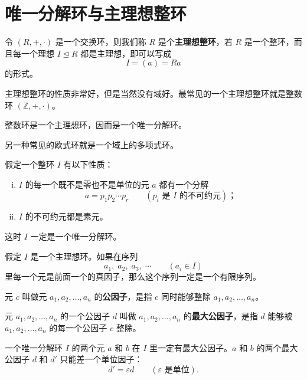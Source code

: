\section{唯一分解环与主理想整环}

\begin{definition}[定义 2.25：主理想整环]
令 $(R,+,\cdot)$ 是一个交换环，则我们称 $R$ 是个\textbf{主理想整环}，若 $R$ 是一个整环，而且每一个理想 $I\trianglelefteq R$ 都是主理想，即可以写成
\[
I=(a)=Ra
\]
的形式。

主理想整环的性质非常好，但是当然没有域好。最常见的一个主理想整环就是整数环 $(\mathbb{Z},+,\cdot)$。
\end{definition}

\begin{theorem}[定理 2：整数环是主理想环]
整数环是一个主理想环，因而是一个唯一分解环。

另一种常见的欧式环就是一个域上的多项式环。
\end{theorem}

\begin{theorem}[定理 2：整环成为唯一分解环的条件]
假定一个整环 $I$ 有以下性质：
\begin{enumerate}[(i)]
  \item $I$ 的每一个既不是零也不是单位的元 $a$ 都有一个分解
  \[
    a=p_1p_2\cdots p_r\qquad(p_i\text{ 是 }I\text{ 的不可约元})；
  \]
  \item[(iii)] $I$ 的不可约元都是素元。
\end{enumerate}
这时 $I$ 一定是一个唯一分解环。
\end{theorem}

\begin{lemma}[引理 1：有限序列判定]
假定 $I$ 是一个主理想环。如果在序列
\[
a_1,\;a_2,\;a_3,\;\cdots\qquad(a_i\in I)
\]
里每一个元是前面一个的真因子，那么这个序列一定是一个有限序列。
\end{lemma}

\begin{definition}[公因子与最大公因子]
元 $c$ 叫做元 $a_1,a_2,\ldots,a_n$ 的\textbf{公因子}，是指 $c$ 同时能够整除 $a_1,a_2,\ldots,a_n$。

元 $a_1,a_2,\ldots,a_n$ 的一个公因子 $d$ 叫做 $a_1,a_2,\ldots,a_n$ 的\textbf{最大公因子}，是指 $d$ 能够被 $a_1,a_2,\ldots,a_n$ 的每一个公因子 $c$ 整除。
\end{definition}

\begin{theorem}[定理 3：最大公因子与单位因子]
一个唯一分解环 $I$ 的两个元 $a$ 和 $b$ 在 $I$ 里一定有最大公因子。$a$ 和 $b$ 的两个最大公因子 $d$ 和 $d'$ 只能差一个单位因子：
\[
d'=\varepsilon d\qquad(\varepsilon\text{ 是单位}).
\]
\end{theorem}

